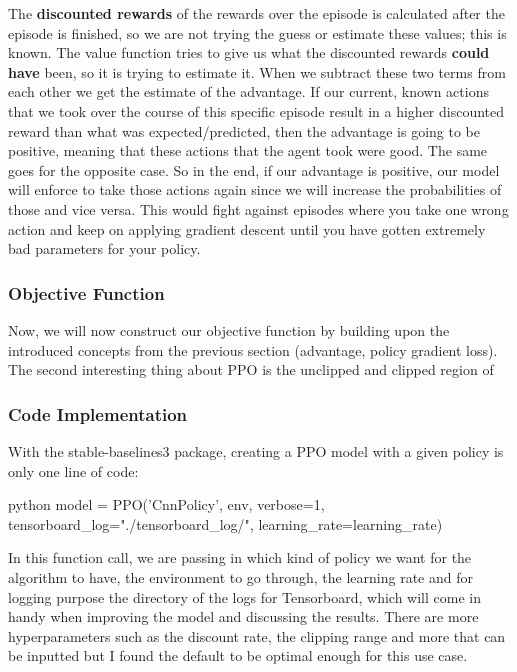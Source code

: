 \documentclass{article}
\numberwithin{equation}{section}
\numberwithin{equation}{section}
\begin{document}
The \textbf{discounted rewards} of the rewards over the episode is calculated after the episode is finished, so we are not trying the guess or estimate these values; this is known. The value function tries to give us what the discounted rewards \textbf{could have} been, so it is trying to estimate it. When we subtract these two terms from each other we get the estimate of the advantage. If our current, known actions that we took over the course of this specific episode result in a higher discounted reward than what was expected/predicted, then the advantage is going to be positive, meaning that these actions that the agent took were good. The same goes for the opposite case. So in the end, if our advantage is positive, our model will enforce to take those actions again since we will increase the probabilities of those and vice versa. This would fight against episodes where you take one wrong action and keep on applying gradient descent until you have gotten extremely bad parameters for your policy.



\subsubsection*{Objective Function}
Now, we will now construct our objective function by building upon the introduced concepts from the previous section (advantage, policy gradient loss). The second interesting thing about PPO is the unclipped and clipped region of 





\subsubsection*{Code Implementation}
With the stable-baselines3 package, creating a PPO model with a given policy is only one line of code:

\begin{mintedbox}{python}
model = PPO('CnnPolicy', env, verbose=1, tensorboard_log="./tensorboard_log/", learning_rate=learning_rate)
\end{mintedbox}

In this function call, we are passing in which kind of policy we want for the algorithm to have, the environment to go through, the learning rate and for logging purpose the directory of the logs for Tensorboard, which will come in handy when improving the model and discussing the results. There are more hyperparameters such as the discount rate, the clipping range and more that can be inputted but I found the default to be optimal enough for this use case.
\end{document}
